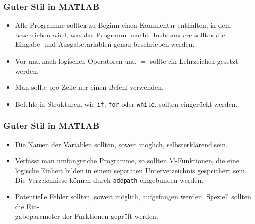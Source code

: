 %
%
\begin{frame}[fragile]\frametitle{Guter Stil in MATLAB}
\begin{itemize}
\item Alle Programme sollten zu Beginn einen Kommentar enthalten, in
  dem beschrieben wird, was das Programm macht. Insbesondere sollten
  die Eingabe- und Ausgabevariablen  genau beschrieben
  werden. 
\item Vor und nach logischen Operatoren und $=$ sollte ein Lehrzeichen
  gesetzt werden.
\item Man sollte pro Zeile nur einen Befehl verwenden.
\item Befehle in  Strukturen, wie  \lstinline!if!, \lstinline!for!
  oder \lstinline!while!, sollten eingerückt werden. 
\end{itemize}
\end{frame}
%
%
\begin{frame}[fragile]\frametitle{Guter Stil in MATLAB}
\begin{itemize}
\item Die Namen der Variablen sollten, soweit möglich, selbsterklärend
  sein.
\item Verfasst man umfangreiche Programme, so sollten M-Funktionen, die
  eine logische Einheit bilden in einem separaten Unterverzeichnis
  gespeichert sein. Die Verzeichnisse können durch \lstinline!addpath!
  eingebunden werden. 
\item Potentielle Fehler sollten, soweit möglich, aufgefangen
  werden. Speziell sollten die Ein- \\
 gabeparameter der Funktionen
  geprüft werden. 
\end{itemize}
\end{frame}

%
%
%



